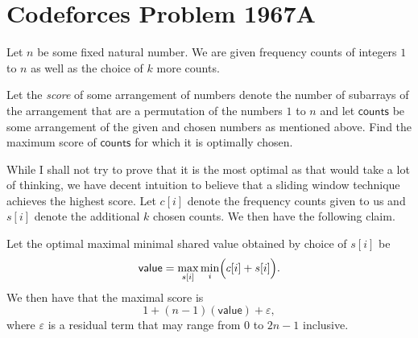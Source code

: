 \documentclass[a4paper, 12pt]{article}
\begin{document}
\section*{Codeforces Problem 1967A}

\begin{chirpbox}
    \begin{problem}
        Let \( n \) be some fixed natural number. We are given frequency counts of integers \( 1 \) to \( n \) as well as the choice of \( k \) more counts.

        \vspace{0.3cm}

        Let the \textit{score} of some arrangement of numbers denote the number of subarrays of the arrangement that are a permutation of the numbers \( 1 \) to \( n \) and let \( \textsf{counts} \) be some arrangement of the given and chosen numbers as mentioned above. Find the maximum score of \( \textsf{counts} \) for which it is optimally chosen.
    \end{problem}
\end{chirpbox}

\begin{solution}
    While I shall not try to prove that it is the most optimal as that would take a lot of thinking, we have decent intuition to believe that a sliding window technique achieves the highest score. Let \( c[i] \) denote the frequency counts given to us and \( s[i] \) denote the additional \( k \) chosen counts. We then have the following claim.

    \begin{claim}
        Let the optimal maximal minimal shared value obtained by choice of \( s[i] \) be
        \[
            \textsf{value} = \max_{s[i]} \min_{i} \Bigl( c[i] + s[i] \Bigr)
        .\]
        We then have that the maximal score is
        \[
            1 + (n-1)(\textsf{value}) + \varepsilon
        ,\]
        where \( \varepsilon \) is a residual term that may range from \( 0 \) to \( 2n - 1 \) inclusive.
    \end{claim}
\end{solution}
\end{document}
